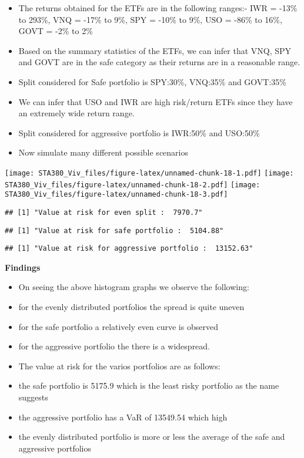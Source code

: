 \documentclass[
  12pt,
]{article}
\begin{document}
\begin{itemize}
\item
  The returns obtained for the ETFs are in the following ranges:- IWR =
  -13\% to 293\%, VNQ = -17\% to 9\%, SPY = -10\% to 9\%, USO = -86\% to
  16\%, GOVT = -2\% to 2\%
\item
  Based on the summary statistics of the ETFs, we can infer that VNQ,
  SPY and GOVT are in the safe category as their returns are in a
  reasonable range.
\item
  Split considered for Safe portfolio is SPY:30\%, VNQ:35\% and
  GOVT:35\%
\item
  We can infer that USO and IWR are high risk/return ETFs since they
  have an extremely wide return range.
\item
  Split considered for aggressive portfolio is IWR:50\% and USO:50\%
\item
  Now simulate many different possible scenarios
\end{itemize}

\texttt{[image: STA380\_Viv\_files/figure-latex/unnamed-chunk-18-1.pdf]}
\texttt{[image: STA380\_Viv\_files/figure-latex/unnamed-chunk-18-2.pdf]}
\texttt{[image: STA380\_Viv\_files/figure-latex/unnamed-chunk-18-3.pdf]}

\begin{verbatim}
## [1] "Value at risk for even split :  7970.7"
\end{verbatim}

\begin{verbatim}
## [1] "Value at risk for safe portfolio :  5104.88"
\end{verbatim}

\begin{verbatim}
## [1] "Value at risk for aggressive portfolio :  13152.63"
\end{verbatim}

\textbf{Findings}

\begin{itemize}
\item
  On seeing the above histogram graphs we observe the following:
\item
  for the evenly distributed portfolios the spread is quite uneven
\item
  for the safe portfolio a relatively even curve is observed
\item
  for the aggressive portfolio the there is a widespread.
\item
  The value at risk for the varios portfolios are as follows:
\item
  the safe portfolio is 5175.9 which is the least risky portfolio as the
  name suggests
\item
  the aggressive portfolio has a VaR of 13549.54 which high
\item
  the evenly distributed portfolio is more or less the average of the
  safe and aggressive portfolios
\end{itemize}
\end{document}
